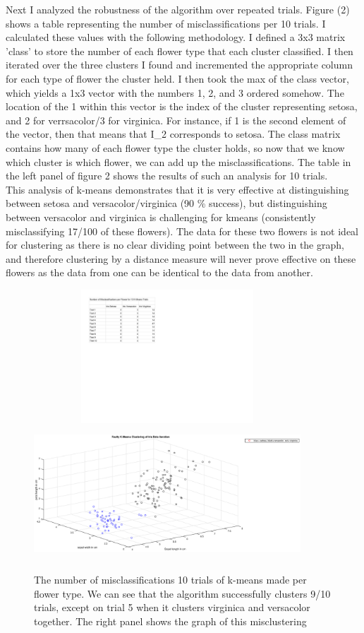 \documentclass{article}
\begin{document}
    Next I analyzed the robustness of the algorithm over repeated trials.  Figure (2) shows a table representing the number of misclassifications per 10 trials.  I calculated these values with the following methodology.  I defined a 3x3 matrix 'class' to store the number of each flower type that each cluster classified.  I then iterated over the three clusters I found and incremented the appropriate column for each type of flower the cluster held.  I then took the max of the class vector, which yields a 1x3 vector with the numbers 1, 2, and 3 ordered somehow.  The location of the 1 within this vector is the index of the cluster representing setosa, and 2 for verrsacolor/3 for virginica.  For instance, if 1 is the second element of the vector, then that means that I\_2 corresponds to setosa.  The class matrix contains how many of each flower type the cluster holds, so now that we know which cluster is which flower, we can add up the misclassifications.  The table in the left panel of figure 2 shows the results of such an analysis for 10 trials.\\
    
    This analysis of k-means demonstrates that it is very effective at distinguishing between setosa and versacolor/virginica (90 \% success), but distinguishing between versacolor and virginica is challenging for kmeans (consistently misclassifying 17/100 of these flowers).  The data for these two flowers is not ideal for clustering as there is no clear dividing point between the two in the graph, and therefore clustering by a distance measure will never prove effective on these flowers as the data from one can be identical to the data from another.  
    
    \begin{figure}[h!]
    \centerline
    {
    \includegraphics[width=10cm, height=5cm] {num_miscl_kmeans} \includegraphics[width=10cm, height=5cm]{bad_k_means_cluster}
    }
    \caption{\label{fig:my figure} The number of misclassifications 10 trials of k-means made per flower type.  We can see that the algorithm successfully clusters 9/10 trials, except on trial 5 when it clusters virginica and versacolor together.  The right panel shows the graph of this misclustering }
    \end{figure}
    
\end{document}
